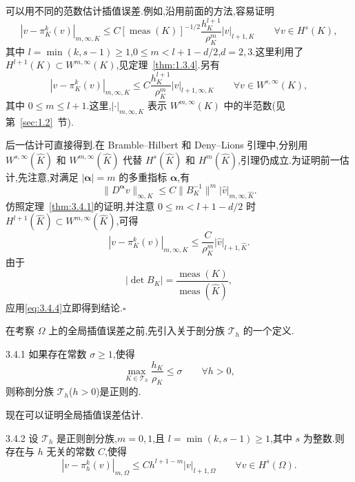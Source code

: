 \begin{note}
可以用不同的范数估计插值误差.例如,沿用前面的方法,容易证明
\[
  |v-\pi_K^k(v)|_{m,\infty,K}
   \le C[\operatorname{meas}(K)]^{-1/2}\frac{h_K^{l+1}}{\rho_K^m}|v|_{l+1,K}
   \qquad \forall v\in H^s(K),
\]
其中 \(l=\min(k,s-1)\ge1\),\(0\le m<l+1-d/2\),\(d=2,3\).这里利用了 \(H^{l+1}(K)\subset W^{m,\infty}(K)\),见定理~\ref{thm:1.3.4}.另有
\[
  |v-\pi_K^k(v)|_{m,\infty,K}
   \le C\frac{h_K^{l+1}}{\rho_K^m}|v|_{l+1,\infty,K}
   \qquad \forall v\in W^{s,\infty}(K),
\]
其中 \(0\le m\le l+1\).这里,\(|\cdot|_{m,\infty,K}\) 表示 \(W^{m,\infty}(K)\) 中的半范数(见第~\ref{sec:1.2}~节).

后一估计可直接得到.在 Bramble--Hilbert 和 Deny--Lions 引理中,分别用 \(W^{s,\infty}(\widehat K)\) 和 \(W^{m,\infty}(\widehat K)\) 代替 \(H^s(\widehat K)\) 和 \(H^m(\widehat K)\),引理仍成立.为证明前一估计,先注意,对满足 \(|\boldsymbol{\alpha}|=m\) 的多重指标 \(\boldsymbol{\alpha}\),有
\[
  \|D^{\boldsymbol{\alpha}}v\|_{\infty,K}
  \le C\|B_K^{-1}\|^m|\widehat v|_{m,\infty,\widehat K}.
\]
仿照定理~\ref{thm:3.4.1}的证明,并注意 \(0\le m<l+1-d/2\) 时 \(H^{l+1}(\widehat K)\subset W^{m,\infty}(\widehat K)\),可得
\[
  |v-\pi_K^k(v)|_{m,\infty,K}
  \le\frac{C}{\rho_K^m}|\widehat v|_{l+1,\widehat K}.
\]
由于
\[
  |\det B_K|=\frac{\operatorname{meas}(K)}{\operatorname{meas}(\widehat K)},
\]
应用\eqref{eq:3.4.4}立即得到结论.\hfill\(\square\)
\end{note}

在考察 \(\Omega\) 上的全局插值误差之前,先引入关于剖分族 \(\mathcal T_h\) 的一个定义.

\begin{definition}[]{3.4.1}
如果存在常数 \(\sigma\ge1\),使得
\begin{equation}\label{eq:3.4.18}
  \max_{K\in\mathcal T_h}\frac{h_K}{\rho_K}\le\sigma
  \qquad \forall h>0,
\end{equation}
则称剖分族 \(\mathcal T_h\)(\(h>0\))是{\heiti 正则的}.
\end{definition}

现在可以证明全局插值误差估计.

\begin{theorem}[]{3.4.2}
设 \(\mathcal T_h\) 是正则剖分族,\(m=0,1\),且 \(l=\min(k,s-1)\ge1\),其中 \(s\) 为整数.则存在与 \(h\) 无关的常数 \(C\),使得
\begin{equation}\label{eq:3.4.19}
  |v-\pi_h^k(v)|_{m,\Omega}
  \le Ch^{l+1-m}|v|_{l+1,\Omega}\qquad \forall v\in H^s(\Omega).
\end{equation}
\end{theorem}

